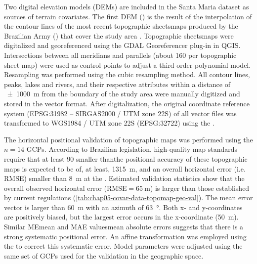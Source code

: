 Two digital elevation models (DEMs) are included in the Santa Maria dataset as sources of terrain covariates. 
The first DEM (\demNew) is the 
result of the interpolation of the contour lines of the most recent topographic sheetsmaps produced by the 
Brazilian 
Army () that cover the study area \cite{DSG1980, DSG1992, DSG1992a}. Topographic sheetsmaps were 
digitalized
and georeferenced using the GDAL Georeferencer plug-in in QGIS. Intersections between all meridians and 
parallels (about \num{160} per topographic sheet map) were used as control points to adjust a third order 
polynomial 
model. Resampling was performed using the cubic resampling method. All contour lines, peaks, lakes and rivers, 
and their respective attributes within a distance of \SI{\pm1000}{\metre} from the boundary of the study area 
were manually digitized and stored in the vector format. After digitalization, the original coordinate 
reference system (EPSG:31982 -- SIRGAS2000 / UTM zone 22S) of all vector files was transformed to WGS1984 / 
UTM zone 22S (EPSG:32722) using the  \cite{BivandEtAl2013a}.

The horizontal positional validation of topographic maps was performed using the $n = 14$ GCPs. According to 
Brazilian 
legislation, high-quality map standards require that at least 90%
smaller thanthe positional accuracy of these topographic maps is expected to be of, at least, 
\SI{1315}{\metre}, and an overall horizontal error (i.e. RMSE) smaller than \SI{8}{\metre} at the 
\cite{Brasil1984}. Estimated validation statistics show that the overall observed horizontal error 
($\text{RMSE} = \SI{65}{\m}$) 
is larger than those established by current regulations (\autoref{tab:chap05-covar-data-topomap-geo-val}). The 
mean error 
vector is larger than \SI{60}{\metre} with an azimuth of \SI{63}{\degree}. Both x- and y-coordinates are 
positively biased, but the largest error occurs in the x-coordinate (\SI{50}{\metre}). Similar MEmean and MAE 
valuesmean 
absolute errors suggests that there is a strong systematic positional error. An affine transformation was 
employed using the  \cite{Carrillo2012} to correct this systematic error. Model 
parameters were adjusted using the same set of GCPs used for the validation in the geographic space.

